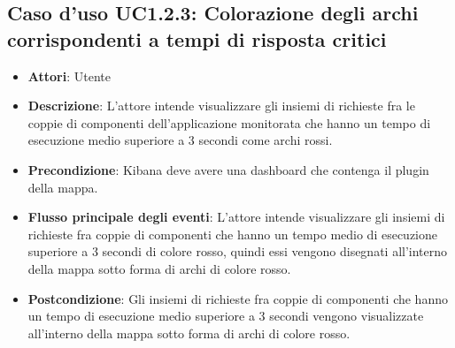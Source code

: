 \subsection{Caso d'uso UC1.2.3: Colorazione degli archi corrispondenti a tempi di risposta critici}
\begin{itemize}
\item \textbf{Attori}: Utente
\item \textbf{Descrizione}: L'attore intende visualizzare gli insiemi di richieste fra le coppie di componenti dell'applicazione monitorata che hanno un tempo di esecuzione medio superiore a 3 secondi come archi rossi.
\item \textbf{Precondizione}: Kibana deve avere una dashboard che contenga il plugin della mappa.
\item \textbf{Flusso principale degli eventi}: L'attore intende visualizzare gli insiemi di richieste fra coppie di componenti che hanno un tempo medio di esecuzione superiore a 3 secondi di colore rosso, quindi essi vengono disegnati all'interno della mappa sotto forma di archi di colore rosso.
\item \textbf{Postcondizione}: Gli insiemi di richieste fra coppie di componenti che hanno un tempo di esecuzione medio superiore a 3 secondi vengono visualizzate all'interno della mappa sotto forma di archi di colore rosso.
\end{itemize}
